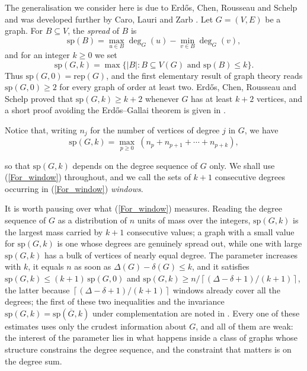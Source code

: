 \documentclass[12pt,a4paper]{article}%
\begin{document}


The generalisation we consider here is due to Erd\H{o}s, Chen, Rousseau and Schelp \cite{Erdos} and
was developed further by Caro, Lauri and Zarb \cite{CaroLauriZarb}. Let $G=(V,E)$ be a graph. For
$B\subseteq V$, the \emph{spread} of $B$ is
\[
\mathrm{sp}(B)=\max_{u\in B}\deg _{G}(u)-\min_{v\in B}\deg _{G}(v),
\]
and for an integer $k\geq 0$ we set
\[
\mathrm{sp}(G,k)=\max \{\left\vert B\right\vert :B\subseteq V(G)\text{ and }\mathrm{sp}
(B)\leq k\}.
\]
Thus $\mathrm{sp}(G,0)=\mathrm{rep}(G)$, and the first elementary result of graph theory reads
$\mathrm{sp}(G,0)\geq 2$ for every graph of order at least two. Erd\H{o}s, Chen, Rousseau and
Schelp proved that $\mathrm{sp}(G,k)\geq k+2$ whenever $G$ has at least $k+2$ vertices, and a short
proof avoiding the Erd\H{o}s--Gallai theorem is given in \cite{CaroLauriZarb}.

Notice that, writing $n_{j}$ for the number of vertices of degree $j$ in $G$, we have
\begin{equation}
\mathrm{sp}(G,k)=\max_{p\geq 0}\ (n_{p}+n_{p+1}+\cdots +n_{p+k}),  \label{For_window}%
\end{equation}


so that $\mathrm{sp}(G,k)$ depends on the degree sequence of $G$ only. We shall use
(\ref{For_window}) throughout, and we call the sets of $k+1$ consecutive degrees occurring in
(\ref{For_window}) \emph{windows}.

It is worth pausing over what (\ref{For_window}) measures. Reading the degree sequence of $G$ as a
distribution of $n$ units of mass over the integers, $\mathrm{sp}(G,k)$ is the largest mass carried by
$k+1$ consecutive values; a graph with a small value for $\mathrm{sp}(G,k)$ is one whose degrees are genuinely spread out,
while one with large $\mathrm{sp}(G,k)$ has a bulk of vertices of nearly equal degree. The
parameter increases with $k$, it equals $n$ as soon as $\Delta (G)-\delta (G)\leq k$, and it satisfies
$\mathrm{sp}(G,k)\leq (k+1)\,\mathrm{sp}(G,0)$ and
$\mathrm{sp}(G,k)\geq n/\left\lceil (\Delta -\delta +1)/(k+1)\right\rceil $, the latter because
$\left\lceil (\Delta -\delta +1)/(k+1)\right\rceil $ windows already cover all the degrees; the first of
these two inequalities and the invariance $\mathrm{sp}(G,k)=\mathrm{sp}(\overline{G},k)$ under
complementation are noted in \cite{CaroLauriZarb}. Every one of these estimates uses only the crudest
information about $G$, and all of them are weak: the interest of the parameter lies in what happens
inside a class of graphs whose structure constrains the degree sequence, and the constraint that matters
is on the degree sum.
\end{document}
